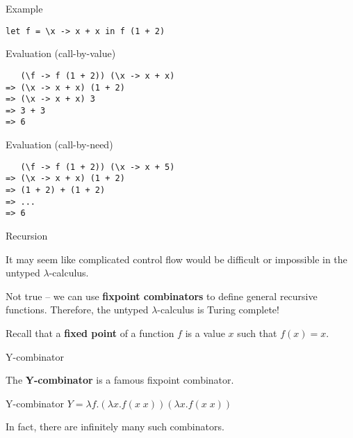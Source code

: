 %
\begin{frame}[fragile]{Example}

\begin{block}{}
\begin{verbatim}
let f = \x -> x + x in f (1 + 2)
\end{verbatim}
\end{block}

\begin{block}{Evaluation (call-by-value)}
\begin{verbatim}
   (\f -> f (1 + 2)) (\x -> x + x)
=> (\x -> x + x) (1 + 2)
=> (\x -> x + x) 3
=> 3 + 3
=> 6
\end{verbatim}
\end{block}

\begin{block}{Evaluation (call-by-need)}
\begin{verbatim}
   (\f -> f (1 + 2)) (\x -> x + 5)
=> (\x -> x + x) (1 + 2)
=> (1 + 2) + (1 + 2)
=> ...
=> 6
\end{verbatim}
\end{block}


\end{frame}

% 
% 

%
\begin{frame}{Recursion}

It may seem like complicated control flow would be difficult or impossible in
the untyped $\lambda$-calculus.

Not true -- we can use \textbf{fixpoint combinators} to define general recursive
functions. Therefore, the untyped $\lambda$-calculus is Turing complete!

Recall that a \textbf{fixed point} of a function $f$ is a value $x$ such that
$f(x) = x$.

\end{frame}

%
\begin{frame}{Y-combinator}

The \textbf{Y-combinator} is a famous fixpoint combinator.

\begin{block}{Y-combinator}
$Y = \lambda f.(\lambda x.f (x \; x)) (\lambda x.f (x \; x))$
\end{block}

In fact, there are infinitely many such combinators.

\end{frame}

